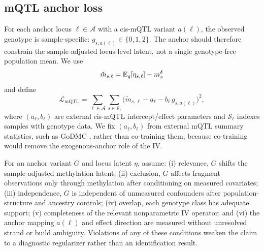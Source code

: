 \subsection{mQTL anchor loss}
For each anchor locus $\ell\in\mathcal{A}$ with a cis-mQTL variant $a(\ell)$, the observed genotype is sample-specific: $g_{s,a(\ell)}\in\{0,1,2\}$. The anchor should therefore constrain the sample-adjusted locus-level latent, not a single genotype-free population mean. We use
\begin{equation}
\tilde m_{s,\ell}=\mathbb{E}_q[\eta_{s,\ell}]-m_s^\delta
\end{equation}
and define
\begin{equation}
\mathcal{L}_{\mathrm{mQTL}} = \sum_{\ell\in\mathcal{A}}\sum_{s\in\mathcal{S}_\ell}\big(\tilde m_{s,\ell} - a_\ell - b_\ell\, g_{s,a(\ell)}\big)^2,
\label{eq:mqtl-loss}
\end{equation}
where $(a_\ell,b_\ell)$ are external cis-mQTL intercept/effect parameters and $\mathcal{S}_\ell$ indexes samples with genotype data. We fix $(a_\ell,b_\ell)$ from external mQTL summary statistics, such as GoDMC \citep{min2021mqtl}, rather than co-training them, because co-training would remove the exogenous-anchor role of the IV.

\begin{assumption}
\label{ass:iv}
For an anchor variant $G$ and locus latent $\eta$, assume: (i) relevance, $G$ shifts the sample-adjusted methylation latent; (ii) exclusion, $G$ affects fragment observations only through methylation after conditioning on measured covariates; (iii) independence, $G$ is independent of unmeasured confounders after population-structure and ancestry controls; (iv) overlap, each genotype class has adequate support; (v) completeness of the relevant nonparametric IV operator; and (vi) the anchor mapping $a(\ell)$ and effect direction are measured without unresolved strand or build ambiguity. Violations of any of these conditions weaken the claim to a diagnostic regularizer rather than an identification result.
\end{assumption}

